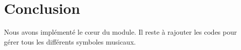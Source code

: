 \section{Conclusion}

Nous avons implémenté le cœur du module. Il reste à rajouter les codes pour gérer tous les différents symboles musicaux.


